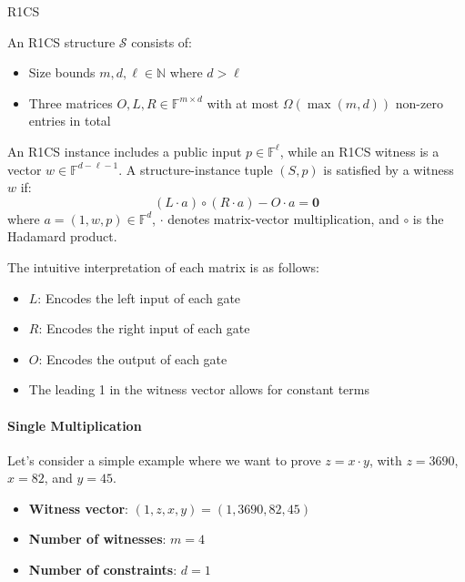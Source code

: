 \documentclass{article}
\begin{document}
\begin{definition}{R1CS}{}

An R1CS structure $\mathcal{S}$ consists of:
\begin{itemize}
\item Size bounds $m, d, \ell \in \mathbb{N}$ where $d > \ell$
\item Three matrices $O, L, R \in \mathbb{F}^{m\times d}$ with at most $ \Omega(\max(m, d))$ non-zero entries in total
\end{itemize}

An R1CS instance includes a public input $p \in \mathbb{F}^\ell$, while an R1CS witness is a vector $w \in \mathbb{F}^{d - \ell - 1}$.
A structure-instance tuple $(S, p)$ is satisfied by a witness $w$ if:
\begin{equation}
(L \cdot a) \circ (R \cdot a) - O \cdot a = \mathbf{0}
\end{equation}
where $a = (1, w, p) \in \mathbb{F}^d$, $\cdot$ denotes matrix-vector multiplication, and $\circ$ is the Hadamard product.

\end{definition}

The intuitive interpretation of each matrix is as follows:

\begin{itemize}
\item $L$: Encodes the left input of each gate
\item $R$: Encodes the right input of each gate
\item $O$: Encodes the output of each gate
\item The leading 1 in the witness vector allows for constant terms
\end{itemize}

\paragraph{Single Multiplication}

Let's consider a simple example where we want to prove $z = x \cdot y$, with $z = 3690$, $x = 82$, and $y = 45$.

\begin{itemize}
    \item \textbf{Witness vector}: $(1, z, x, y) = (1, 3690, 82, 45)$
    \item \textbf{Number of witnesses}: $m = 4$
    \item \textbf{Number of constraints}: $d = 1$
\end{itemize}
\end{document}
